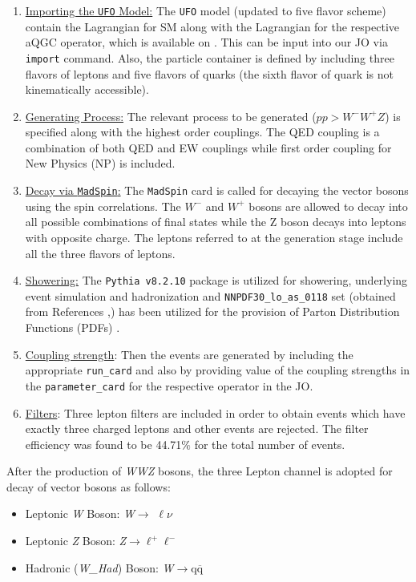 \begin{enumerate}

	\item \underline{Importing the \texttt{UFO} Model:} The \texttt{UFO} model (updated to five flavor scheme) contain the Lagrangian for SM along with the Lagrangian for the respective aQGC operator, which is available on \cite{aQGC}. This can be input into our JO via \texttt{import} command.  Also, the particle container is defined by including three flavors of leptons and five flavors of quarks (the sixth flavor of quark is not kinematically accessible). 

	\item \underline{Generating Process:} The relevant process to be generated ($pp > W^{-}W^{+}Z$) is specified along with the highest order couplings. The QED coupling is a combination of both QED and EW couplings while first order coupling for New Physics (NP) is included.

	\item \underline{Decay via \texttt{MadSpin}:} The \texttt{MadSpin} \cite{MadSpin} card is called for decaying the vector bosons using the spin correlations. The $W^{-}$ and $W^{+}$ bosons are allowed to decay into all possible combinations of final states while the Z boson decays into leptons with opposite charge. The leptons referred to at the generation stage include all the three flavors of leptons.

	\item \underline{Showering:} The \texttt{Pythia v8.2.10} \cite{Pythia8} package is utilized for showering, underlying event simulation and hadronization and  \texttt{NNPDF30\_lo\_as\_0118} set (obtained from References  \cite{Buckley2015},\cite{PDFset-Webpage}) has been utilized for the provision of Parton Distribution Functions (PDFs) \cite{Placakyte:2011az}.

	\item \underline{Coupling strength}: Then the events are generated by including the appropriate \texttt{run\_card} and also by providing value of the coupling strengths in the \texttt{parameter\_card} for the respective operator in the JO.

	\item \underline{Filters}: Three lepton filters are included in order to obtain events which have exactly three charged leptons and other events are rejected. The filter efficiency was found to be 44.71$\%$ for the total number of events.
\end{enumerate}
After the production of \textit{WWZ} bosons, the three Lepton channel is adopted for decay of vector bosons as follows:
\begin{itemize}
	\item  Leptonic \textit{W} Boson: \textit{W}$\rightarrow$ $\ell\nu$      
	\item  Leptonic \textit{Z} Boson: \textit{Z}$\rightarrow$$\ell^{+}\ell^{-}$ 
	\item  Hadronic (\textit{W\_Had}) Boson: \textit{W}$\rightarrow$$ \text{q}\overline{\text{q}}$      
\end{itemize}
